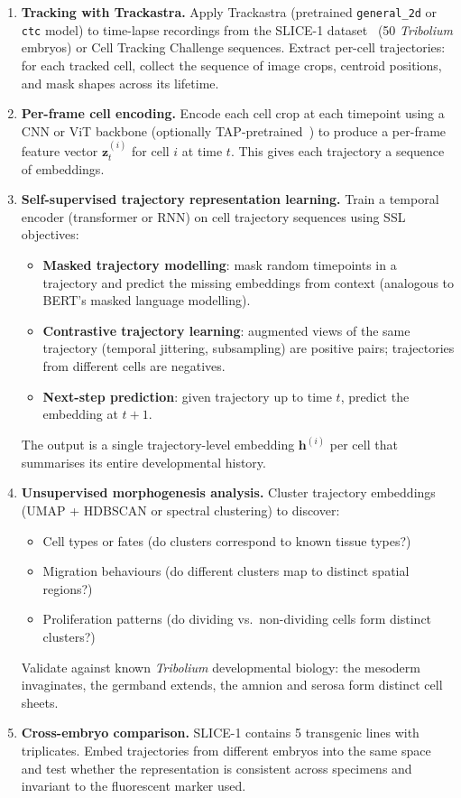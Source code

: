 \documentclass{article}
\begin{document}
\begin{enumerate}
	\item \textbf{Tracking with Trackastra.} Apply Trackastra (pretrained \texttt{general\_2d} or \texttt{ctc} model) to time-lapse recordings from the SLICE-1 dataset~\cite{slice1} (50 \textit{Tribolium} embryos) or Cell Tracking Challenge sequences. Extract per-cell trajectories: for each tracked cell, collect the sequence of image crops, centroid positions, and mask shapes across its lifetime.

	\item \textbf{Per-frame cell encoding.} Encode each cell crop at each timepoint using a CNN or ViT backbone (optionally TAP-pretrained~\cite{tap}) to produce a per-frame feature vector $\mathbf{z}_t^{(i)}$ for cell $i$ at time $t$. This gives each trajectory a sequence of embeddings.

	\item \textbf{Self-supervised trajectory representation learning.} Train a temporal encoder (transformer or RNN) on cell trajectory sequences using SSL objectives:
	      \begin{itemize}
		      \item \textbf{Masked trajectory modelling}: mask random timepoints in a trajectory and predict the missing embeddings from context (analogous to BERT's masked language modelling).
		      \item \textbf{Contrastive trajectory learning}: augmented views of the same trajectory (temporal jittering, subsampling) are positive pairs; trajectories from different cells are negatives.
		      \item \textbf{Next-step prediction}: given trajectory up to time $t$, predict the embedding at $t{+}1$.
	      \end{itemize}
	      The output is a single trajectory-level embedding $\mathbf{h}^{(i)}$ per cell that summarises its entire developmental history.

	\item \textbf{Unsupervised morphogenesis analysis.} Cluster trajectory embeddings (UMAP + HDBSCAN or spectral clustering) to discover:
	      \begin{itemize}
		      \item Cell types or fates (do clusters correspond to known tissue types?)
		      \item Migration behaviours (do different clusters map to distinct spatial regions?)
		      \item Proliferation patterns (do dividing vs.\ non-dividing cells form distinct clusters?)
	      \end{itemize}
	      Validate against known \textit{Tribolium} developmental biology: the mesoderm invaginates, the germband extends, the amnion and serosa form distinct cell sheets.

	\item \textbf{Cross-embryo comparison.} SLICE-1 contains 5 transgenic lines with triplicates. Embed trajectories from different embryos into the same space and test whether the representation is consistent across specimens and invariant to the fluorescent marker used.
\end{enumerate}
\end{document}

